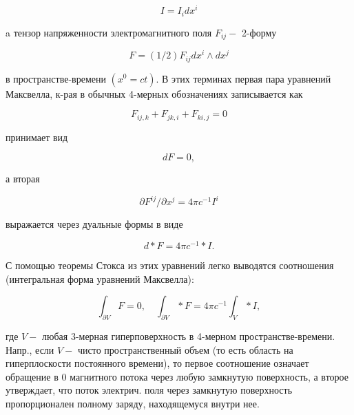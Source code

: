 \documentclass[10pt]{article}
\begin{document}
\[

I=I_{i} d x^{i}

\]



a тензор напряженности электромагнитного поля $F_{i j}-$ 2-форму



\[

F=(1 / 2) F_{i j} d x^{i} \wedge d x^{j}

\]



в пространстве-времени $\left(x^{0}=c t\right)$. В этих терминах первая пара уравнений Максвелла, к-рая в обычных 4-мерных обозначениях записывается как



\[

F_{i j, k}+F_{j k, i}+F_{k i, j}=0

\]



принимает вид



\[

d F=0,

\]



а вторая



\[

\partial F^{i j} / \partial x^{j}=4 \pi c^{-1} I^{i}

\]



выражается через дуальные формы в виде



\[

d * F=4 \pi c^{-1} * I .

\]



С помощью теоремы Стокса из этих уравнений легко выводятся соотношения (интегральная форма уравнений Максвелла):



\[

\int_{\partial V} F=0, \quad \int_{\partial V} * F=4 \pi c^{-1} \int_{V} * I,

\]



где $V-$ любая 3-мерная гиперповерхность в 4-мерном пространстве-времени. Напр., если $V-$ чисто пространственный объем (то есть область на гиперплоскости постоянного времени), то первое соотношение означает обращение в 0 магнитного потока через любую замкнутую поверхность, а второе утверждает, что поток электрич. поля через замкнутую поверхность пропорционален полному заряду, находящемуся внутри нее.
\end{document}
